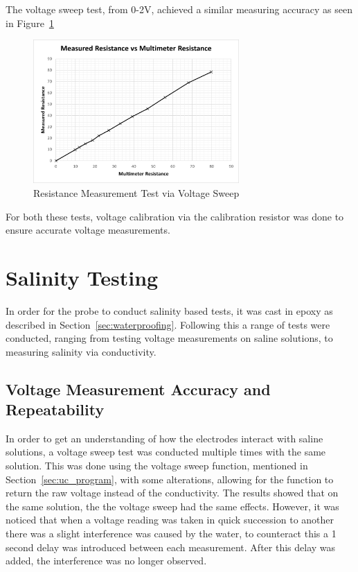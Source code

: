 The voltage sweep test, from 0-2V, achieved a similar measuring accuracy as seen in Figure~\ref{fig:resistance_measurement_test}
\begin{figure}[H]
    \centering
    \includegraphics[width=0.7\textwidth]{figures/resistance_measurement_test.png}
    \caption{Resistance Measurement Test via Voltage Sweep}
    \label{fig:resistance_measurement_test}
\end{figure}

For both these tests, voltage calibration via the calibration resistor was done to ensure accurate voltage measurements.

\section{Salinity Testing}
In order for the probe to conduct salinity based tests, it was cast in epoxy as described in Section~\ref{sec:waterproofing}.
Following this a range of tests were conducted, ranging from testing voltage measurements on saline solutions, to measuring salinity via conductivity.

\subsection{Voltage Measurement Accuracy and Repeatability}
In order to get an understanding of how the electrodes interact with saline solutions, a voltage sweep test was conducted multiple times with the same solution.
This was done using the voltage sweep function, mentioned in Section~\ref{sec:uc_program}, with some alterations, allowing for the function to return the raw voltage instead of the conductivity.
The results showed that on the same solution, the the voltage sweep had the same effects.
However, it was noticed that when a voltage reading was taken in quick succession to another there was a slight interference was caused by the water, to counteract this a 1 second delay was introduced between each measurement.
After this delay was added, the interference was no longer observed.

